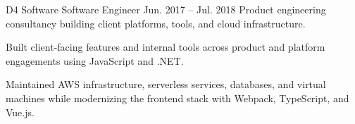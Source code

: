 \ResumeJob
  {D4 Software}
  {Software Engineer}
  {Jun. 2017 -- Jul. 2018}
  {Product engineering consultancy building client platforms, tools, and cloud infrastructure.}
\begin{ResumeList}
  \item Built client-facing features and internal tools across product and platform engagements using JavaScript and .NET.
  \item Maintained AWS infrastructure, serverless services, databases, and virtual machines while modernizing the frontend stack with Webpack, TypeScript, and Vue.js.
\end{ResumeList}
